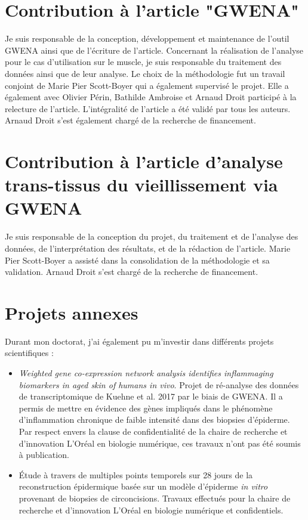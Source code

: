 \section{Contribution à l'article "GWENA"}

Je suis responsable de la conception, développement et maintenance de l'outil GWENA ainsi que de l'écriture de l'article. Concernant la réalisation de l'analyse pour le cas d'utilisation sur le muscle, je suis responsable du traitement des données ainsi que de leur analyse. Le choix de la méthodologie fut un travail conjoint de Marie Pier Scott-Boyer qui a également supervisé le projet. Elle a également avec Olivier Périn, Bathilde Ambroise et Arnaud Droit participé à la relecture de l'article. L'intégralité de l'article a été validé par tous les auteurs. Arnaud Droit s'est également chargé de la recherche de financement.


\section{Contribution à l'article d'analyse trans-tissus du vieillissement via GWENA}

Je suis responsable de la conception du projet, du traitement et de l'analyse des données, de l'interprétation des résultats, et de la rédaction de l'article. Marie Pier Scott-Boyer a assisté dans la consolidation de la méthodologie et sa validation. Arnaud Droit s'est chargé de la recherche de financement.


\section{Projets annexes}

Durant mon doctorat, j'ai également pu m'investir dans différents projets scientifiques :
\begin{itemize}
    \item \textit{Weighted gene co-expression network analysis identifies inflammaging biomarkers in aged skin of humans in vivo}. Projet de ré-analyse des données de transcriptomique de Kuehne et al. 2017 par le biais de GWENA. Il a permis de mettre en évidence des gènes impliqués dans le phénomène d'inflammation chronique de faible intensité dans des biopsies d'épiderme. Par respect envers la clause de confidentialité de la chaire de recherche et d'innovation L'Oréal en biologie numérique, ces travaux n'ont pas été soumis à publication.
    \item Étude à travers de multiples points temporels sur 28 jours de la reconstruction épidermique basée sur un modèle d'épiderme \textit{in vitro} provenant de biopsies de circoncisions. Travaux effectués pour la chaire de recherche et d'innovation L'Oréal en biologie numérique et confidentiels.
\end{itemize}

